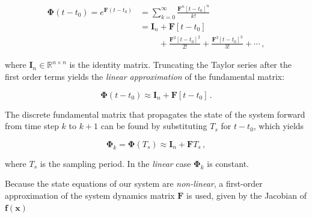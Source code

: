 \begin{equation}
\begin{split}
  \bm{\Phi}(t-t_0) = e^{\mathbf{F}(t-t_0)} &= \sum_{k=0} ^ {\infty} \frac {\mathbf{F}^{n} [t-t_0]^n}{k!} \\
  &= \mathbf{I}_n + \mathbf{F}[t-t_0] \\ 
  & \mathrel{\phantom{= \mathbf{I}_n}} + \frac{\mathbf{F}^2 [t-t_0]^2}{2!} +\frac{\mathbf{F}^{3} [t-t_0]^3}{3!} + \cdots\,,
\end{split}
\end{equation}
 
\noindent
where $\mathbf{I}_n \in \mathbb{R}^{n \times n}$ is the identity matrix. Truncating the Taylor series after the first order terms yields the \emph{linear approximation} of the fundamental matrix:

\begin{equation}
  \bm{\Phi}(t-t_0) \approx \mathbf{I}_n + \mathbf{F}[t-t_0]\,.
\end{equation}

\noindent
The discrete fundamental matrix that propagates the state of the system forward from time step $k$ to $k+1$ can be found by substituting $T_s$ for $t-t_0$, which yields

\begin{equation}
  \bm{\Phi}_{k} = \bm{\Phi}(T_s) \approx \mathbf{I}_{n} + \mathbf{F} T_s\,,
\end{equation}

\noindent
where $T_s$ is the sampling period. In the \emph{linear} case $\bm{\Phi}_{k}$ is constant.

Because the state equations of our system are \emph{non-linear}, a first-order approximation of the system dynamics matrix $\mathbf{F}$ is used, given by the Jacobian of $\mathbf{f}(\mathbf{x})$

